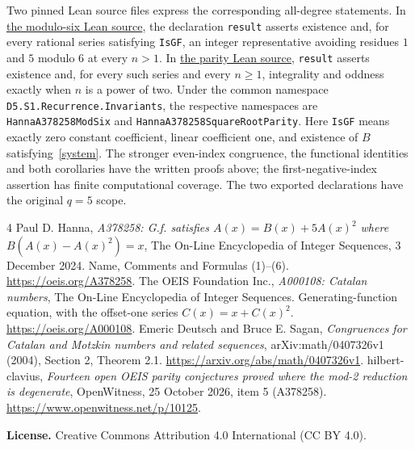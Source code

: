 \documentclass[11pt]{article}
\begin{document}
Two pinned Lean source files express the corresponding all-degree statements. In
\href{https://github.com/the-omega-institute/trureturing/blob/01b573fd9b691a4be3a8b0ecbb41b3311eda19b5/D5/S1/Recurrence/Invariants/HannaA378258ModSix.lean}{the modulo-six Lean source},
the declaration \texttt{result} asserts existence and, for every rational series satisfying \texttt{IsGF}, an integer representative avoiding residues $1$ and $5$ modulo $6$ at every $n>1$. In
\href{https://github.com/the-omega-institute/trureturing/blob/01b573fd9b691a4be3a8b0ecbb41b3311eda19b5/D5/S1/Recurrence/Invariants/HannaA378258SquareRootParity.lean}{the parity Lean source},
\texttt{result} asserts existence and, for every such series and every $n\geq1$, integrality and oddness exactly when $n$ is a power of two. Under the common namespace \texttt{D5.S1.Recurrence.Invariants}, the respective namespaces are \texttt{HannaA378258ModSix} and \texttt{HannaA378258SquareRootParity}. Here \texttt{IsGF} means exactly zero constant coefficient, linear coefficient one, and existence of $B$ satisfying~\eqref{system}. The stronger even-index congruence, the functional identities and both corollaries have the written proofs above; the first-negative-index assertion has finite computational coverage. The two exported declarations have the original $q=5$ scope.

\begin{thebibliography}{4}
 Paul D. Hanna, \emph{A378258: G.f. satisfies $A(x)=B(x)+5A(x)^2$ where $B(A(x)-A(x)^2)=x$}, The On-Line Encyclopedia of Integer Sequences, 3 December 2024. Name, Comments and Formulas (1)--(6). \url{https://oeis.org/A378258}.
 The OEIS Foundation Inc., \emph{A000108: Catalan numbers}, The On-Line Encyclopedia of Integer Sequences. Generating-function equation, with the offset-one series $C(x)=x+C(x)^2$. \url{https://oeis.org/A000108}.
 Emeric Deutsch and Bruce E. Sagan, \emph{Congruences for Catalan and Motzkin numbers and related sequences}, arXiv:math/0407326v1 (2004), Section 2, Theorem 2.1. \url{https://arxiv.org/abs/math/0407326v1}.
 hilbert-clavius, \emph{Fourteen open OEIS parity conjectures proved where the mod-2 reduction is degenerate}, OpenWitness, 25 October 2026, item 5 (A378258). \url{https://www.openwitness.net/p/10125}.
\end{thebibliography}
\medskip
\noindent\textbf{License.} Creative Commons Attribution 4.0 International (CC BY 4.0).
\end{document}
